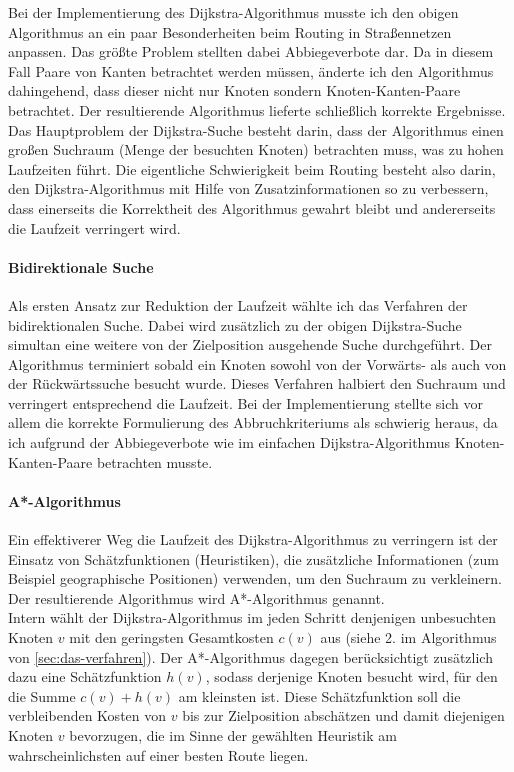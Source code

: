 \message{ !name(bericht.tex)}\documentclass[twoside, a4paper]{scrartcl}
\begin{document}
Bei der Implementierung des Dijkstra-Algorithmus musste ich den obigen Algorithmus an ein paar Besonderheiten beim Routing in Straßennetzen anpassen. Das größte Problem stellten dabei Abbiegeverbote dar. Da in diesem Fall Paare von Kanten betrachtet werden müssen, änderte ich den Algorithmus dahingehend, dass dieser nicht nur Knoten sondern Knoten-Kanten-Paare betrachtet. Der resultierende Algorithmus lieferte schließlich korrekte Ergebnisse. 
\\
 Das Hauptproblem der Dijkstra-Suche besteht darin, dass der Algorithmus einen großen Suchraum (Menge der besuchten Knoten) betrachten muss, was zu hohen Laufzeiten führt. Die eigentliche Schwierigkeit beim Routing besteht also darin, den Dijkstra-Algorithmus mit Hilfe von Zusatzinformationen so zu verbessern, dass einerseits die Korrektheit des Algorithmus gewahrt bleibt und andererseits die Laufzeit verringert wird. 

\paragraph{Bidirektionale Suche}
\label{sec:bidirektionale-suche}

Als ersten Ansatz zur Reduktion der Laufzeit wählte ich das Verfahren der bidirektionalen Suche. Dabei wird zusätzlich zu der obigen Dijkstra-Suche simultan eine weitere von der Zielposition ausgehende Suche durchgeführt. Der Algorithmus terminiert sobald ein Knoten sowohl von der Vorwärts- als auch von der Rückwärtssuche besucht wurde. Dieses Verfahren halbiert den Suchraum und verringert entsprechend die Laufzeit. Bei der Implementierung stellte sich vor allem die korrekte Formulierung des Abbruchkriteriums als schwierig heraus, da ich aufgrund der Abbiegeverbote wie im einfachen Dijkstra-Algorithmus Knoten-Kanten-Paare betrachten musste. 

\paragraph{ A*-Algorithmus}
\label{sec:eins-von-heur}

Ein effektiverer Weg die Laufzeit des Dijkstra-Algorithmus zu verringern ist der Einsatz von Schätzfunktionen (Heuristiken), die zusätzliche Informationen (zum Beispiel geographische Positionen)  verwenden, um den Suchraum zu verkleinern. Der resultierende Algorithmus wird A*-Algorithmus genannt.\\
Intern wählt der Dijkstra-Algorithmus im jeden Schritt denjenigen unbesuchten Knoten $v$ mit den geringsten Gesamtkosten $c(v)$ aus (siehe 2. im Algorithmus von \ref{sec:das-verfahren}). Der A*-Algorithmus dagegen berücksichtigt zusätzlich dazu eine Schätzfunktion $h(v)$, sodass derjenige Knoten besucht wird, für den die Summe $c(v) + h(v)$ am kleinsten ist. Diese Schätzfunktion soll die verbleibenden Kosten von $v$ bis zur Zielposition abschätzen und damit diejenigen Knoten $v$ bevorzugen, die im Sinne der gewählten Heuristik am wahrscheinlichsten auf einer besten Route liegen. 
\end{document}
